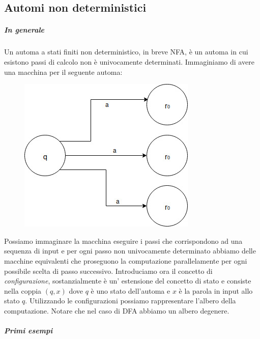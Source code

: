 \subsection{Automi non deterministici}
\subparagraph{In generale}
Un automa a stati finiti non deterministico, in breve NFA, \`e un automa in cui esistono passi di calcolo non \`e univocamente determinati.\newline
Immaginiamo di avere una macchina per il seguente automa:
\begin{figure}[H]
	\includegraphics[scale=0.5]{nfa0}
\end{figure}
Possiamo immaginare la macchina eseguire i passi che corrispondono ad una sequenza di input e per ogni passo non univocamente determinato abbiamo delle macchine equivalenti che proseguono la computazione parallelamente per ogni possibile scelta di passo successivo.\newline
Introduciamo ora il concetto di \emph{configurazione}, sostanzialmente \`e un' estensione del concetto di stato e consiste nella coppia $(q, x)$ dove $q$ \`e uno stato dell'automa e $x$ \`e la parola in input allo stato $q$.\newline
Utilizzando le configurazioni possiamo rappresentare l'albero della computazione. Notare che nel caso di DFA abbiamo un albero degenere.
\subparagraph{Primi esempi}
